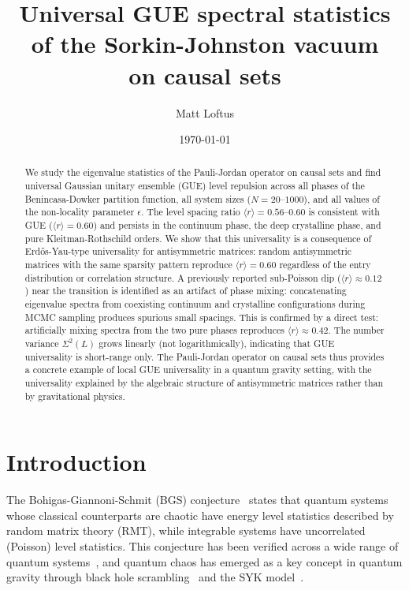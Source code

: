 \documentclass[aps,prd,twocolumn,superscriptaddress,nofootinbib]{revtex4-2}
\begin{document}
\title{Universal GUE spectral statistics of the Sorkin-Johnston vacuum\\on causal sets}

\author{Matt Loftus}

\date{\today}

\begin{abstract}
We study the eigenvalue statistics of the Pauli-Jordan operator on causal sets and find universal Gaussian unitary ensemble (GUE) level repulsion across all phases of the Benincasa-Dowker partition function, all system sizes ($N = 20$--$1000$), and all values of the non-locality parameter $\epsilon$. The level spacing ratio $\langle r \rangle = 0.56$--$0.60$ is consistent with GUE ($\langle r \rangle = 0.60$) and persists in the continuum phase, the deep crystalline phase, and pure Kleitman-Rothschild orders. We show that this universality is a consequence of Erd\H{o}s-Yau-type universality for antisymmetric matrices: random antisymmetric matrices with the same sparsity pattern reproduce $\langle r \rangle = 0.60$ regardless of the entry distribution or correlation structure. A previously reported sub-Poisson dip ($\langle r \rangle \approx 0.12$) near the transition is identified as an artifact of phase mixing: concatenating eigenvalue spectra from coexisting continuum and crystalline configurations during MCMC sampling produces spurious small spacings. This is confirmed by a direct test: artificially mixing spectra from the two pure phases reproduces $\langle r \rangle \approx 0.42$. The number variance $\Sigma^2(L)$ grows linearly (not logarithmically), indicating that GUE universality is short-range only. The Pauli-Jordan operator on causal sets thus provides a concrete example of local GUE universality in a quantum gravity setting, with the universality explained by the algebraic structure of antisymmetric matrices rather than by gravitational physics.
\end{abstract}

\maketitle

\section{Introduction}

The Bohigas-Giannoni-Schmit (BGS) conjecture~\cite{bgs1984} states that quantum systems whose classical counterparts are chaotic have energy level statistics described by random matrix theory (RMT), while integrable systems have uncorrelated (Poisson) level statistics. This conjecture has been verified across a wide range of quantum systems~\cite{haake2010}, and quantum chaos has emerged as a key concept in quantum gravity through black hole scrambling~\cite{maldacena2016} and the SYK model~\cite{sachdev1993,kitaev2015}.
\end{document}
